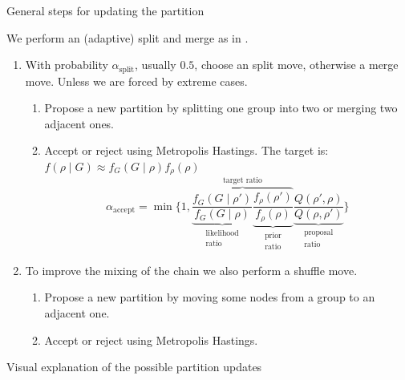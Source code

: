 \begin{frame}{General steps for updating the partition}
    
    We perform an (adaptive) \alert{split and merge} as in \cite{bensonAdaptiveMCMCMultiple2018}.
    \begin{enumerate}
        \item With probability $\alpha_{\text{split}}$, usually $0.5$, choose an \alert{split move}, otherwise a \alert{merge move}. Unless we are forced by extreme cases.
        \begin{enumerate}
            \item Propose a new partition by splitting one group into two or merging two adjacent ones.
            \item Accept or reject using Metropolis Hastings. The target is:
            $f(\rho \mid G) \approx f_G(G \mid \rho) f_{\rho}(\rho)$
            \[
                \alpha_{\text{accept}} = \min
                \bigg\{1,
                \overbrace{
                \underbrace{\frac{f_G\left(G \mid \rho'\right)}{f_G(G \mid \rho)}}_{\substack{\text{likelihood}\\\text{ratio}}}
                \underbrace{\frac{f_\rho\left(\rho'\right)}{f_\rho(\rho)}}_{\substack{\text{prior}\\\text{ratio}}}
                }^{\text{target ratio}}
                \underbrace{\frac{Q(\rho',\rho)}{Q(\rho,\rho')}}_{\substack{\text{proposal}\\\text{ratio}}}
                \bigg\}
            \]
        \end{enumerate}
        \item To improve the mixing of the chain we also perform a \alert{shuffle move}.
        \begin{enumerate}
            \item Propose a new partition by moving some nodes from a group to an adjacent one.
            \item Accept or reject using Metropolis Hastings.
        \end{enumerate}

    \end{enumerate}

\end{frame}

\begin{frame}{Visual explanation of the possible partition updates}
\end{frame}







